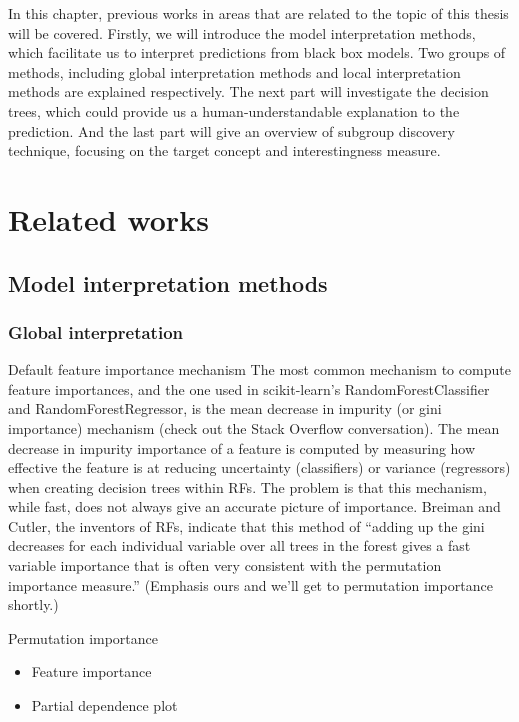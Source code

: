 In this chapter, previous works in areas that are related to the topic of this thesis will be covered. Firstly, we will introduce the model interpretation methods, which facilitate us to interpret predictions from black box models. Two groups of methods, including global interpretation methods and local interpretation methods are explained respectively. The next part will investigate the decision trees, which could provide us a human-understandable explanation to the prediction. And the last part will give an overview of subgroup discovery technique, focusing on the target concept and interestingness measure. 

\section{Related works}


\subsection{Model interpretation methods}

\subsubsection{Global interpretation}

Default feature importance mechanism
The most common mechanism to compute feature importances, and the one used in scikit-learn's RandomForestClassifier and RandomForestRegressor, is the mean decrease in impurity (or gini importance) mechanism (check out the Stack Overflow conversation). The mean decrease in impurity importance of a feature is computed by measuring how effective the feature is at reducing uncertainty (classifiers) or variance (regressors) when creating decision trees within RFs. The problem is that this mechanism, while fast, does not always give an accurate picture of importance. Breiman and Cutler, the inventors of RFs, indicate that this method of “adding up the gini decreases for each individual variable over all trees in the forest gives a fast variable importance that is often very consistent with the permutation importance measure.” (Emphasis ours and we'll get to permutation importance shortly.)

Permutation importance
\begin{itemize}
	\item Feature importance
	\item Partial dependence plot
\end{itemize}

